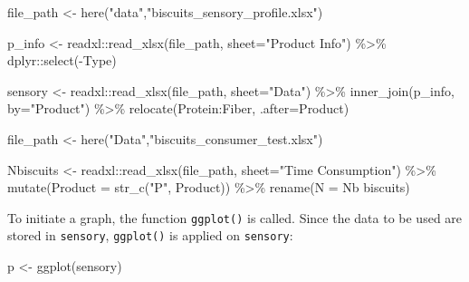 \documentclass[
]{krantz}
\makeatletter
\newenvironment{Shaded}{\begin{snugshade}}{\end{snugshade}}
\newcommand{\AttributeTok}[1]{\textcolor[rgb]{0.61,0.61,0.61}{#1}}
\newcommand{\FunctionTok}[1]{\textcolor[rgb]{0,0,0}{#1}}
\newcommand{\NormalTok}[1]{#1}
\newcommand{\OtherTok}[1]{\textcolor[rgb]{0.37,0.37,0.37}{#1}}
\newcommand{\SpecialCharTok}[1]{\textcolor[rgb]{0,0,0}{#1}}
\newcommand{\StringTok}[1]{\textcolor[rgb]{0.5,0.5,0.5}{#1}}
\newenvironment{kframe}{%
\medskip{}
\setlength{\fboxsep}{.8em}
 \def\at@end@of@kframe{}%
 \ifinner\ifhmode%
  \def\at@end@of@kframe{\end{minipage}}%
  \begin{minipage}{\columnwidth}%
 \fi\fi%
 \def\FrameCommand##1{\hskip\@totalleftmargin \hskip-\fboxsep
 \colorbox{shadecolor}{##1}\hskip-\fboxsep
     \hskip-\linewidth \hskip-\@totalleftmargin \hskip\columnwidth}%
 \MakeFramed {\advance\hsize-\width
   \@totalleftmargin\z@ \linewidth\hsize
   \@setminipage}}%
 {\par\unskip\endMakeFramed%
 \at@end@of@kframe}
\renewenvironment{Shaded}{\begin{kframe}}{\end{kframe}}
\makeatother
\begin{document}
\begin{Shaded}
\begin{Highlighting}[]
\NormalTok{file\_path }\OtherTok{\textless{}{-}} \FunctionTok{here}\NormalTok{(}\StringTok{"data"}\NormalTok{,}\StringTok{"biscuits\_sensory\_profile.xlsx"}\NormalTok{) }

\NormalTok{p\_info }\OtherTok{\textless{}{-}}\NormalTok{ readxl}\SpecialCharTok{::}\FunctionTok{read\_xlsx}\NormalTok{(file\_path, }\AttributeTok{sheet=}\StringTok{"Product Info"}\NormalTok{) }\SpecialCharTok{\%\textgreater{}\%} 
\NormalTok{  dplyr}\SpecialCharTok{::}\FunctionTok{select}\NormalTok{(}\SpecialCharTok{{-}}\NormalTok{Type)}

\NormalTok{sensory }\OtherTok{\textless{}{-}}\NormalTok{ readxl}\SpecialCharTok{::}\FunctionTok{read\_xlsx}\NormalTok{(file\_path, }\AttributeTok{sheet=}\StringTok{"Data"}\NormalTok{) }\SpecialCharTok{\%\textgreater{}\%} 
  \FunctionTok{inner\_join}\NormalTok{(p\_info, }\AttributeTok{by=}\StringTok{"Product"}\NormalTok{) }\SpecialCharTok{\%\textgreater{}\%} 
  \FunctionTok{relocate}\NormalTok{(Protein}\SpecialCharTok{:}\NormalTok{Fiber, }\AttributeTok{.after=}\NormalTok{Product)}

\NormalTok{file\_path }\OtherTok{\textless{}{-}} \FunctionTok{here}\NormalTok{(}\StringTok{"Data"}\NormalTok{,}\StringTok{"biscuits\_consumer\_test.xlsx"}\NormalTok{)}

\NormalTok{Nbiscuits }\OtherTok{\textless{}{-}}\NormalTok{ readxl}\SpecialCharTok{::}\FunctionTok{read\_xlsx}\NormalTok{(file\_path, }\AttributeTok{sheet=}\StringTok{"Time Consumption"}\NormalTok{) }\SpecialCharTok{\%\textgreater{}\%} 
  \FunctionTok{mutate}\NormalTok{(}\AttributeTok{Product =} \FunctionTok{str\_c}\NormalTok{(}\StringTok{"P"}\NormalTok{, Product)) }\SpecialCharTok{\%\textgreater{}\%} 
  \FunctionTok{rename}\NormalTok{(}\AttributeTok{N =} \StringTok{\textasciigrave{}}\AttributeTok{Nb biscuits}\StringTok{\textasciigrave{}}\NormalTok{)}
\end{Highlighting}
\end{Shaded}

To initiate a graph, the function \texttt{ggplot()} is called.
Since the data to be used are stored in \texttt{sensory}, \texttt{ggplot()} is applied on \texttt{sensory}:

\begin{Shaded}
\begin{Highlighting}[]
\NormalTok{p }\OtherTok{\textless{}{-}} \FunctionTok{ggplot}\NormalTok{(sensory)}
\end{Highlighting}
\end{Shaded}
\end{document}
